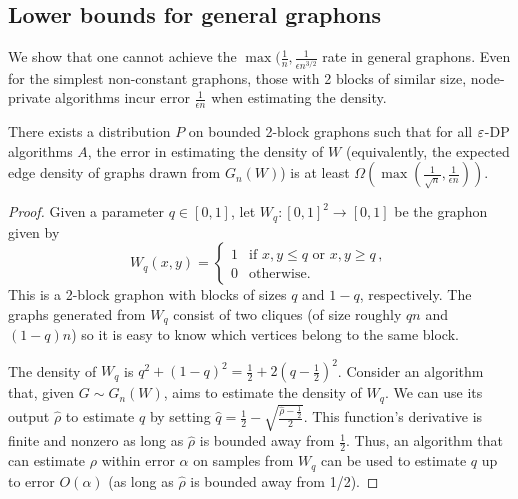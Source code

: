 \subsection{Lower bounds for general graphons}
\label{sec:lower-one-block}

We show that one cannot achieve the $\max(\frac 1 n, \frac 1
{\epsilon n^{3/2}}$ rate in general graphons. Even for the simplest
non-constant graphons, those with 2 blocks of similar size,
node-private algorithms incur error $\frac1 {\epsilon n}$ when
estimating the density. 

\begin{theorem}
  There exists a distribution $P$ on bounded 2-block graphons such that 
  for all $\varepsilon$-DP algorithms $A$, the error in estimating the
  density of $W$ (equivalently, the expected edge density of graphs
  drawn from $G_n(W)$) is at least $\Omega(\max (\frac{1}{\sqrt{n}},
  \frac 1 {\epsilon n}))$.
\end{theorem}

\begin{proof}
  Given a parameter $q\in [0,1]$, let $W_q:[0,1]^2\to [0,1]$ be the
  graphon given by 
  $$W_q(x,y) =
  \begin{cases}
    1 & \text{if } x, y \leq q \text{ or } x,y \geq q\, , \\
    0 & \text{otherwise.}
  \end{cases}$$
  This is a 2-block graphon with blocks of sizes $q$ and $1-q$,
  respectively. The graphs generated from $W_q$ consist of two
  cliques (of size roughly $qn$ and $(1-q)n$) so it is easy to know
  which vertices belong to the same block. 

  The density of $W_q$ is
  $q^2+ (1-q)^2 = \frac 1 2 + 2 (q-\frac 1 2)^2$. Consider an
  algorithm that, given $G\sim G_n(W)$, aims to estimate the density
  of $W_q$. We can use its output $\hat \rho$ to estimate $q$ by
  setting $\hat q = \frac 1 2 - \sqrt{\frac{\hat \rho - \frac 1
      2}{2}}$. This function's derivative is finite and nonzero as
  long as $\hat \rho$ is bounded away from $\frac 1 2$. Thus, an
  algorithm that can estimate $\rho$ within error $\alpha$ on samples
  from $W_q$ can be used to estimate $q$ up to error $O(\alpha)$ (as
  long as $\hat \rho$ is bounded away from 1/2). 

  

  

\end{proof}


